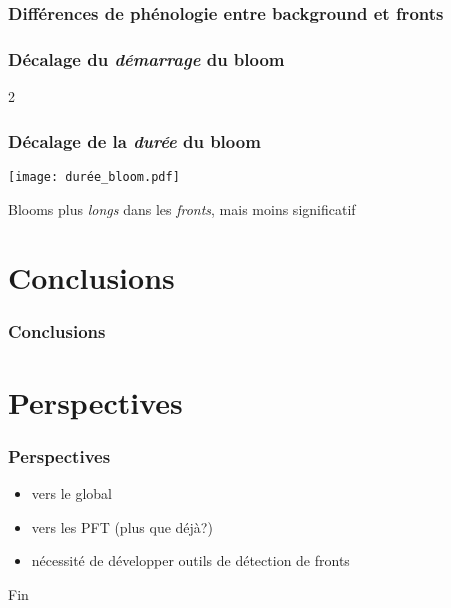 
\begin{frame}
  \frametitle{Différences de phénologie entre background et fronts}
\end{frame}


\begin{frame}
  \frametitle{Décalage du \emph{\textit{démarrage}} du bloom}

  \vfill

  \begin{overlayarea}{\textwidth}{2\baselineskip}

  \end{overlayarea}
\end{frame}


\begin{frame}
  \frametitle{Décalage de la \emph{\textit{durée}} du bloom}
  \texttt{[image: durée\_bloom.pdf]}

  \vfill

  Blooms plus \emph{longs} dans les \emph{fronts}, mais moins significatif
\end{frame}


\section{Conclusions}

\begin{frame}
  \frametitle{Conclusions}

\end{frame}


\section{Perspectives}
\begin{frame}
  \frametitle{Perspectives}

  \begin{itemize}
    \item vers le global
    \item vers les PFT (plus que déjà?)
    \item nécessité de développer outils de détection de fronts
  \end{itemize}

\end{frame}


\begin{frame}
  Fin
\end{frame}


